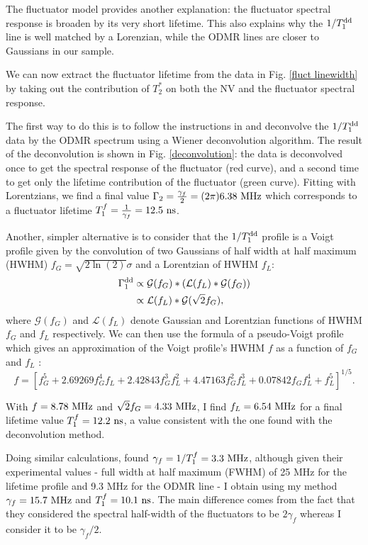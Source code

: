 \documentclass[a4paper,11pt]{report}
\begin{document}
The fluctuator model provides another explanation: the fluctuator spectral response is broaden by its very short lifetime. This also explains why the $1/T_1^{\rm dd}$ line is well matched by a Lorenzian, while the ODMR lines are closer to Gaussians in our sample. 

We can now extract the fluctuator lifetime from the data in Fig. \ref{fluct linewidth} by taking out the contribution of $T_2^*$ on both the NV and the fluctuator spectral response. 

The first way to do this is to follow the instructions in \citep{hall2016detection} and deconvolve the $1/T_1^{\rm dd}$ data by the ODMR spectrum using a Wiener deconvolution algorithm. The result of the deconvolution is shown in Fig. \ref{deconvolution}: the data is deconvolved once to get the spectral response of the fluctuator (red curve), and a second time to get only the lifetime contribution of the fluctuator (green curve). Fitting with Lorentzians, we find a final value $\Gamma_2 =\frac{\gamma_f}{2} = (2\pi) 6.38\ \rm MHz$ which corresponds to a fluctuator lifetime $T_1^f=\frac{1}{\gamma_f}=12.5\ \rm ns$.

Another, simpler alternative is to consider that the $1/T_1^{\rm dd}$ profile is a Voigt profile given by the convolution of two Gaussians of half width at half maximum (HWHM) $f_G=\sqrt{2 \ln (2)}\sigma$ and a Lorentzian of HWHM $f_L$:
\begin{align*}
\Gamma_1^{\rm dd}&\propto \mathcal{G}(f_G)*(\mathcal{L}(f_L)*\mathcal{G}(f_G)) \\
&\propto \mathcal{L}(f_L)*\mathcal{G}(\sqrt{2} f_G),
\end{align*}
where $\mathcal{G}(f_G)$ and $\mathcal{L}(f_L)$ denote Gaussian and Lorentzian functions of HWHM $f_G$ and $f_L$ respectively.
We can then use the formula of a pseudo-Voigt profile which gives an approximation of the Voigt profile's HWHM $f$ as a function of $f_G$ and $f_L$ \citep{wiki:VoigtProfile}:
\begin{equation}
f = [f_G^5 + 2.69269 f_G^4 f_L + 2.42843 f_G^3 f_L^2 + 4.47163 f_G^2 f_L^3 + 0.07842 f_G f_L^4 + f_L^5]^{1/5}.
\end{equation}

With $f=8.78\ \rm MHz$ and $\sqrt{2}f_G=4.33\ \rm MHz$, I find $f_L=6.54\ \rm MHz$ for a final lifetime value $T_1^f = 12.2\ \rm ns$, a value consistent with the one found with the deconvolution method.

Doing similar calculations, \citep{choi2017depolarization} found $\gamma_f=1/T_1^f=3.3\ \rm MHz$, although given their experimental values - full width at half maximum (FWHM) of 25 MHz for the lifetime profile and 9.3 MHz for the ODMR line - I obtain using my method $\gamma_f= 15.7\ \rm MHz$ and $T_1^f=10.1\ \rm ns$. The main difference comes from the fact that they considered the spectral half-width of the fluctuators to be $2\gamma_f$ whereas I consider it to be $\gamma_f/2$.
\end{document}
